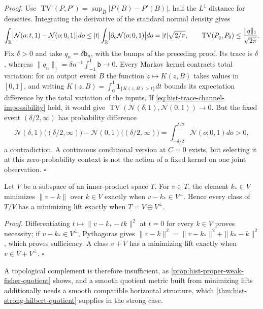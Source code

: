 \noindent\emph{Proof.}
Use \(\operatorname{TV}(P,P')=\sup_B|P(B)-P'(B)|\), half the \(L^1\) distance for
densities. Integrating the derivative of the standard normal density gives
\begin{equation}
\int_\mathbb R\bigl|\mathcal N(o;t,1)-\mathcal N(o;0,1)\bigr|do
\leq|t|\int_\mathbb R\bigl|\partial_o\mathcal N(o;0,1)\bigr|do
=|t|\sqrt{2/\pi},
\qquad
\operatorname{TV}(P_q,P_0)\leq\frac{\|q\|_1}{\sqrt{2\pi}}.
\label{eq:hist-trace-total-variation-bound}
\end{equation}
Fix \(\delta>0\) and take \(q_n=\delta\mathsf b_n\), with the bumps of the
preceding proof. Its trace is \(\delta\), whereas
\(\|q_n\|_1=\delta n^{-1}\int_{-1}^1\mathsf b\to0\). Every Markov kernel
contracts total variation: for an output event \(B\) the function
\(z\mapsto K(z,B)\) takes values in \([0,1]\), and writing
\(K(z,B)=\int_0^1\mathbf1_{\{K(z,B)>t\}}dt\) bounds its expectation difference by
the total variation of the inputs. If \eqref{eq:hist-trace-channel-impossibility}
held, it would give
\(\operatorname{TV}(\mathcal N(\delta,1),\mathcal N(0,1))\to0\). But the fixed
event \((\delta/2,\infty)\) has probability difference
\begin{equation}
\mathcal N(\delta,1)\bigl((\delta/2,\infty)\bigr)
-\mathcal N(0,1)\bigl((\delta/2,\infty)\bigr)
=\int_{-\delta/2}^{\delta/2}\mathcal N(o;0,1)do>0,
\label{eq:hist-trace-output-separation}
\end{equation}
a contradiction. A continuous conditional version at \(C=0\) exists, but
selecting it at this zero-probability context is not the action of a fixed
kernel on one joint observation. \(\square\)

Let \(V\) be a subspace of an inner-product space \(T\). For \(v\in T\), the
element \(k_*\in V\) minimizes \(\|v-k\|\) over \(k\in V\) exactly when
\(v-k_*\in V^\perp\). Hence every class of \(T/V\) has a minimizing lift exactly
when \(T=V\oplus V^\perp\). 

\noindent\emph{Proof.}
Differentiating \(t\mapsto\|v-k_*-tk\|^2\) at \(t=0\) for every \(k\in V\)
proves necessity; if \(v-k_*\in V^\perp\), Pythagoras gives
\(\|v-k\|^2=\|v-k_*\|^2+\|k_*-k\|^2\), which proves sufficiency. A class
\(v+V\) has a minimizing lift exactly when \(v\in V+V^\perp\). \(\square\)

A topological complement is therefore insufficient, as
\cref{prop:hist-proper-weak-fisher-quotient} shows, and a smooth quotient metric
built from minimizing lifts additionally needs a smooth compatible horizontal
structure, which \cref{thm:hist-strong-hilbert-quotient} supplies in the strong
case.


